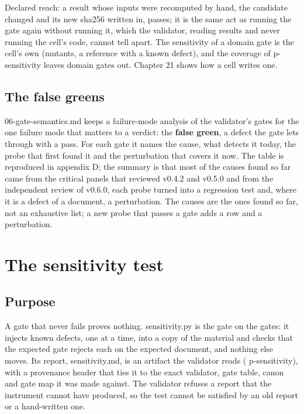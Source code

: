 \documentclass[
  american,
  10pt,
]{report}
\renewcommand{\texttt}[1]{{\ttfamily\hyphenchar\font=-1 #1}}
\begin{document}
Declared reach: a result whose inputs were recomputed by hand, the
candidate changed and its new sha256 written in, passes; it is the same
act as running the gate again without running it, which the validator,
reading results and never running the cell's code, cannot tell apart.
The sensitivity of a domain gate is the cell's own (mutants, a reference
with a known defect), and the coverage of
\texttt{p-\allowbreak{}sensitivity} leaves domain gates out. Chapter 21
shows how a cell writes one.

\section{The false greens}\label{the-false-greens}

\texttt{06-\allowbreak{}gate-\allowbreak{}semantics.\allowbreak{}md}
keeps a failure-mode analysis of the validator's gates for the one
failure mode that matters to a verdict: the \textbf{false green}, a
defect the gate lets through with a pass. For each gate it names the
cause, what detects it today, the probe that first found it and the
perturbation that covers it now. The table is reproduced in appendix D;
the summary is that most of the causes found so far came from the
critical panels that reviewed v0.4.2 and v0.5.0 and from the independent
review of v0.6.0, each probe turned into a regression test and, where it
is a defect of a document, a perturbation. The causes are the ones found
so far, not an exhaustive list; a new probe that passes a gate adds a
row and a perturbation.

\chapter{The sensitivity test}\label{the-sensitivity-test-1}

\section{Purpose}\label{purpose-1}

A gate that never fails proves nothing.
\texttt{sensitivity.\allowbreak{}py} is the gate on the gates: it
injects known defects, one at a time, into a copy of the material and
checks that the expected gate rejects each on the expected document, and
nothing else moves. Its report, \texttt{sensitivity.\allowbreak{}md}, is
an artifact the validator reads (\texttt{p-\allowbreak{}sensitivity}),
with a provenance header that ties it to the exact validator, gate
table, canon and gate map it was made against. The validator refuses a
report that the instrument cannot have produced, so the test cannot be
satisfied by an old report or a hand-written one.
\end{document}
